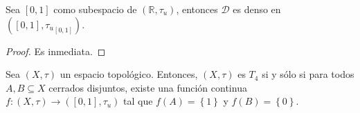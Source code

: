 \documentclass[12pt]{report}
\theoremstyle{largebreak}
\newcommand\cf[3]{\ensuremath{#1:#2\rightarrow#3}}
\begin{document}
    \begin{propo}
        Sea $[0,1]$ como subespacio de $(\mathbb{R},\tau_u)$, entonces $\mathcal{D}$ es denso en $([0,1],{\tau_u}_{[0,1]})$.
    \end{propo}

    \begin{proof}
        Es inmediata.
    \end{proof}

    \begin{lema}
        Sea $(X,\tau)$ un espacio topológico. Entonces, $(X,\tau)$ es $T_4$ si y sólo si para todos $A,B\subseteq X$ cerrados disjuntos, existe una función continua $\cf{f}{(X,\tau)}{([0,1],\tau_u)}$ tal que $f(A)=\left\{1\right\}$ y $f(B)=\left\{0\right\}$.
    \end{lema}
\end{document}
